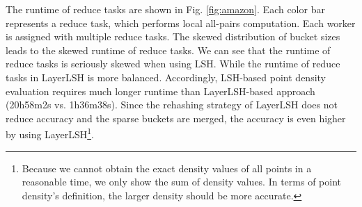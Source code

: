 The runtime of reduce tasks are shown in Fig. \ref{fig:amazon}. Each color bar represents a reduce task, which performs local all-pairs computation. Each worker is assigned with multiple reduce tasks. The skewed distribution of bucket sizes leads to the skewed runtime of reduce tasks. We can see that the runtime of reduce tasks is seriously skewed when using LSH. While the runtime of reduce tasks in LayerLSH is more balanced. Accordingly, LSH-based point density evaluation requires much longer runtime than LayerLSH-based approach (20h58m2s vs. 1h36m38s). Since the rehashing strategy of LayerLSH does not reduce accuracy and the sparse buckets are merged, the accuracy is even higher by using LayerLSH\footnote{Because we cannot obtain the exact density values of all points in a reasonable time, we only show the sum of density values. In terms of point density's definition, the larger density should be more accurate.}.



